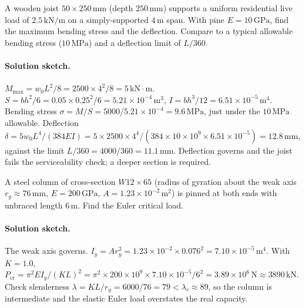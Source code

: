 \begin{exercise}
A wooden joist $50 \times 250\,\si{\milli\meter}$ (depth $250\,\si{
\milli\meter}$) supports a uniform residential live load of $2.5\,
\text{kN}/\text{m}$ on a simply-supported $4\,\si{\meter}$ span.
With pine $E = 10\,\text{GPa}$, find the maximum bending stress and
the deflection. Compare to a typical allowable bending stress
($10\,\text{MPa}$) and a deflection limit of $L/360$.

\paragraph{Solution sketch.} $M_{\max} = w_0L^2/8 = 2500\times 4^2/8 =
5\,\text{kN}\cdot\text{m}$. $S = bh^2/6 = 0.05\times 0.25^2/6 =
5.21\times 10^{-4}\,\si{\meter\cubed}$, $I = bh^3/12 = 6.51\times
10^{-5}\,\si{\meter\tothe{4}}$. Bending stress $\sigma = M/S = 5000/
5.21\times 10^{-4} = 9.6\,\text{MPa}$, just under the $10\,\text{MPa}$
allowable. Deflection $\delta = 5w_0L^4/(384EI) = 5\times 2500\times
4^4/(384\times 10\times 10^9 \times 6.51\times 10^{-5}) = 12.8\,\si{
\milli\meter}$, against the limit $L/360 = 4000/360 = 11.1\,\si{\milli
\meter}$. Deflection governs and the joist fails the serviceability
check; a deeper section is required.
\end{exercise}

\begin{exercise}
A steel column of cross-section $W12 \times 65$ (radius of gyration
about the weak axis $r_y \approx 76\,\si{\milli\meter}$, $E = 200\,
\text{GPa}$, $A = 1.23 \times 10^{-2}\,\si{\meter\squared}$) is
pinned at both ends with unbraced length $6\,\si{\meter}$. Find the
Euler critical load.

\paragraph{Solution sketch.} The weak axis governs. $I_y = A r_y^2 =
1.23\times 10^{-2} \times 0.076^2 = 7.10\times 10^{-5}\,\si{\meter
\tothe{4}}$. With $K=1.0$, $P_{\text{cr}} = \pi^2 E I_y/(KL)^2 =
\pi^2\times 200\times 10^9 \times 7.10\times 10^{-5}/6^2 = 3.89\times
10^6\,\text{N} \approx 3890\,\text{kN}$. Check slenderness $\lambda =
KL/r_y = 6000/76 = 79 < \lambda_c \approx 89$, so the column is
intermediate and the elastic Euler load overstates the real capacity.
\end{exercise}


